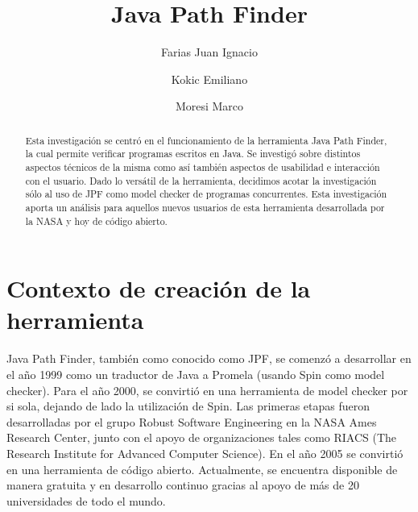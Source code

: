 \documentclass[runningheads]{llncs}
\begin{document}
%
\title{\textbf{Java Path Finder}
}
%
%
\author{Farias Juan Ignacio\and
Kokic Emiliano\and
Moresi Marco}
%
%
%
\maketitle              %
%
\begin{abstract}
Esta investigaci\'on se centr\'o en el funcionamiento de la herramienta Java Path Finder, la cual permite verificar programas escritos en Java. Se investig\'o sobre distintos aspectos t\'ecnicos de la misma como as\'i tambi\'en aspectos de usabilidad e interacción con el usuario.
Dado lo vers\'atil de la herramienta, decidimos acotar la investigaci\'on s\'olo al uso de JPF como model checker de programas concurrentes. Esta investigaci\'on aporta un an\'alisis para aquellos nuevos usuarios de esta herramienta desarrollada por la NASA y hoy de c\'odigo abierto.


\end{abstract}
%
%
%
\section{Contexto de creaci\'on de la herramienta}

Java Path Finder, tambi\'en como conocido como JPF,  se comenz\'o a desarrollar en el año  1999 como un traductor de Java a Promela (usando Spin como model checker). Para el año 2000, se convirti\'o en una herramienta de model checker por si sola, dejando de lado la utilizaci\'on de Spin. Las primeras etapas fueron desarrolladas por el grupo Robust Software Engineering en la NASA Ames Research Center, junto con el apoyo de organizaciones tales como RIACS (The Research Institute for Advanced Computer Science).
En el a\~no 2005 se convirti\'o en una herramienta de c\'odigo abierto. Actualmente, se encuentra disponible de manera gratuita y en desarrollo continuo gracias al apoyo de m\'as de 20 universidades de todo el mundo.
\end{document}
